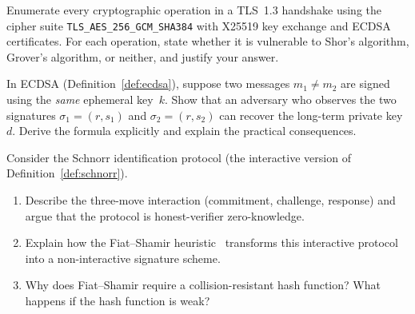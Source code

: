 \begin{prob}
\label{prob:ch03-tls}
Enumerate every cryptographic operation in a TLS~1.3 handshake using the cipher suite \texttt{TLS\_AES\_256\_GCM\_SHA384} with X25519 key exchange and ECDSA certificates.  For each operation, state whether it is vulnerable to Shor's algorithm, Grover's algorithm, or neither, and justify your answer.
\end{prob}

\begin{prob}
\label{prob:ch03-ecdsa-nonce}
In ECDSA (Definition~\ref{def:ecdsa}), suppose two messages $m_1 \neq m_2$ are signed using the \emph{same} ephemeral key~$k$.  Show that an adversary who observes the two signatures $\sigma_1 = (r, s_1)$ and $\sigma_2 = (r, s_2)$ can recover the long-term private key~$d$.  Derive the formula explicitly and explain the practical consequences.
\end{prob}

\begin{prob}
\label{prob:ch03-fiat-shamir}
Consider the Schnorr identification protocol (the interactive version of Definition~\ref{def:schnorr}).
\begin{enumerate}
\item[(a)] Describe the three-move interaction (commitment, challenge, response) and argue that the protocol is honest-verifier zero-knowledge.
\item[(b)] Explain how the Fiat--Shamir heuristic~\cite{FiatShamir1986} transforms this interactive protocol into a non-interactive signature scheme.
\item[(c)] Why does Fiat--Shamir require a collision-resistant hash function?  What happens if the hash function is weak?
\end{enumerate}
\end{prob}
